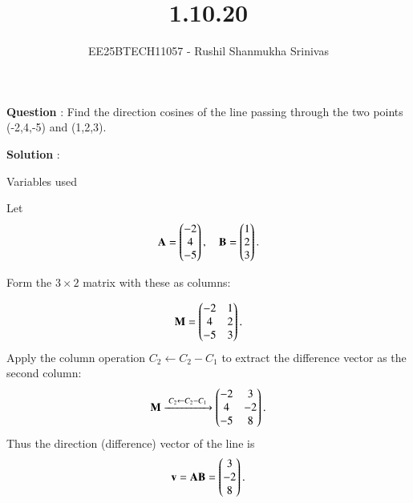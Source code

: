 \documentclass[journal]{IEEEtran}
\begin{document}




\title{1.10.20}
\author{EE25BTECH11057 - Rushil Shanmukha Srinivas
}
{\let\newpage\relax\maketitle}

\renewcommand{\thefigure}{\theenumi}
\renewcommand{\thetable}{\theenumi}
\setlength{\intextsep}{10pt} %

\renewcommand{\thetable}{\theenumi}

\textbf{Question} : Find the direction cosines of the line passing through the two points (-2,4,-5) and (1,2,3).

\textbf{Solution} : 

\begin{table}[h!]
\centering

\caption{Variables used}
\end{table}
Let
\begin{align}
\mathbf{A}=\begin{pmatrix}-2 \\ 4 \\ -5\end{pmatrix} ,\quad
\mathbf{B}=\begin{pmatrix}1 \\ 2 \\ 3\end{pmatrix} .
\end{align}

Form the $3\times2$ matrix with these as columns:

\begin{align}
\mathbf{M}=\begin{pmatrix}-2 & 1 \\ 4 & 2 \\ -5 & 3\end{pmatrix} .
\end{align}
Apply the column operation $C_2\leftarrow C_2-C_1$ to extract the difference vector as the second column:
\begin{align}
\mathbf{M} \xrightarrow{\;C_2\leftarrow C_2-C_1\;}
\begin{pmatrix}-2 & 3 \\ 4 & -2 \\ -5 & 8\end{pmatrix} .
\end{align}
Thus the direction (difference) vector of the line is
\begin{align}
\mathbf{v}=\mathbf{AB}=\begin{pmatrix}3 \\ -2 \\ 8\end{pmatrix} .
\end{align}
\end{document}
